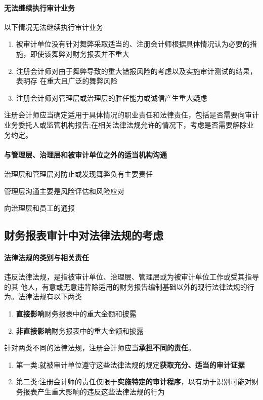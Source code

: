 \documentclass[UTF8,12pt]{ctexart}
\numberwithin{equation}{section} %
\numberwithin{figure}{section}
\numberwithin{table}{section}
\begin{document}
	\paragraph{无法继续执行审计业务}
	以下情况无法继续执行审计业务
	\begin{enumerate}
		\item 被审计单位没有针对舞弊采取适当的、注册会计师根据具体情况认为必要的措施，即使该舞弊对财务报表并不重大
		
		\item 注册会计师对由于舞弊导致的重大错报风险的考虑以及实施审计测试的结果，表明存
		在重大且广泛的舞弊风险
		
		\item 注册会计师对管理层或治理层的胜任能力或诚信产生重大疑虑
	\end{enumerate}
	
	注册会计师应当确定适用于具体情况的职业责任和法律责任，包括是否需要向审计业务委托人或监管机构报告;在相关法律法规允许的情况下，考虑是否需要解除业务约定。
	
	\paragraph{与管理层、治理层和被审计单位之外的适当机构沟通}
	
	治理层和管理层对防止或发现舞弊负有主要责任
	
	管理层沟通主要是风险评估和风险应对 
	
	向治理层和员工的通报
	
	\subsection{财务报表审计中对法律法规的考虑}
	
	\paragraph{法律法规的类别与相关责任}
	违反法律法规，是指被审计单位、治理层、管理层或为被审计单位工作或受其指导的其 他人，有意或无意违背除适用的财务报告编制基础以外的现行法律法规的行为。法律法规有以下两类
	\begin{enumerate}
		\item \textbf{直接影响}财务报表中的重大金额和披露
		
		\item \textbf{非直接影响}财务报表中的重大金额和披露
	\end{enumerate}
	
	针对两类不同的法律法规，注册会计师应当\textbf{承担不同的责任}。 
	\begin{enumerate}
		\item 第一类:就被审计单位遵守这些法律法规的规定\textbf{获取充分、适当的审计证据}
		
		\item 第二类:注册会计师的责任仅限于\textbf{实施特定的审计程序}，以有助于识别可能对财务报表产生重大影响的违反这些法律法规的行为
	\end{enumerate}
	
\end{document}
